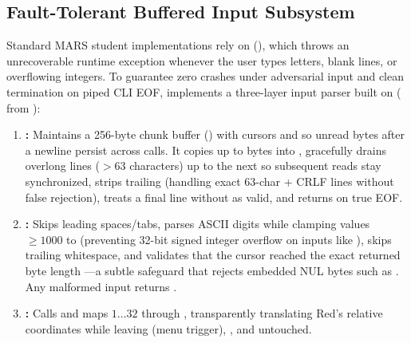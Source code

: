 \subsection{Fault-Tolerant Buffered Input Subsystem}
\label{sec:input_parser}
Standard MARS student implementations rely on  (), which throws an unrecoverable runtime exception whenever the user types letters, blank lines, or overflowing integers. To guarantee zero crashes under adversarial input and clean termination on piped CLI EOF,  implements a three-layer input parser built on  ( from ):
\begin{enumerate}
    \item \textbf{:} Maintains a 256-byte chunk buffer () with cursors  and  so unread bytes after a newline persist across calls. It copies up to  bytes into , gracefully drains overlong lines ($> 63$ characters) up to the next  so subsequent reads stay synchronized, strips trailing  (handling exact 63-char + CRLF lines without false rejection), treats a final line without  as valid, and returns  on true EOF.
    \item \textbf{:} Skips leading spaces/tabs, parses ASCII digits while clamping values $\ge 1000$ to  (preventing 32-bit signed integer overflow on inputs like ), skips trailing whitespace, and validates that the cursor reached the exact returned byte length ---a subtle safeguard that rejects embedded NUL bytes such as . Any malformed input returns .
    \item \textbf{:} Calls  and maps $1 \dots 32$ through , transparently translating Red's relative coordinates while leaving  (menu trigger), , and  untouched.
\end{enumerate}
